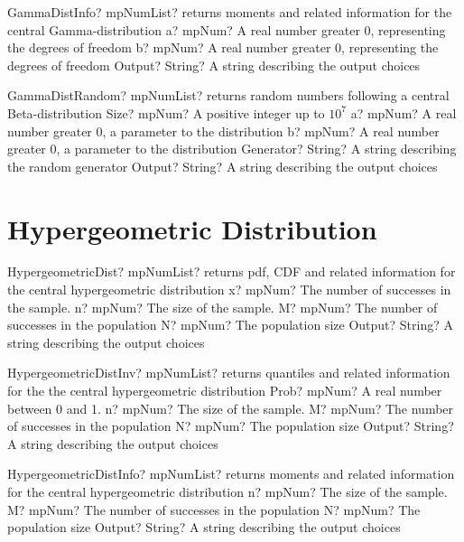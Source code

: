 \documentclass[12pt,a4paper,openany]{book}
\begin{document}
\begin{mpFunctionsExtract}
\mpFunctionTwo
{GammaDistInfo? mpNumList? returns moments and related information for the central Gamma-distribution}
{a? mpNum? A real number greater 0, representing the degrees of freedom}
{b? mpNum? A real number greater 0, representing the degrees of freedom}
{Output? String? A string describing the output choices}
\end{mpFunctionsExtract}

\begin{mpFunctionsExtract}
\mpFunctionFive
{GammaDistRandom? mpNumList? returns random numbers following a central Beta-distribution}
{Size? mpNum? A positive integer up to $10^7$}
{a? mpNum? A real number greater 0, a parameter to the distribution}
{b? mpNum? A real number greater 0, a parameter to the distribution}
{Generator? String? A string describing the random generator}
{Output? String? A string describing the output choices}
\end{mpFunctionsExtract}

\section{Hypergeometric Distribution}

\begin{mpFunctionsExtract}
\mpFunctionFive
{HypergeometricDist? mpNumList? returns pdf, CDF and related information for the central hypergeometric distribution}
{x? mpNum? The number of successes in the sample.}
{n? mpNum? The size of the sample.}
{M? mpNum? The number of successes in the population}
{N? mpNum? The population size}
{Output? String? A string describing the output choices}
\end{mpFunctionsExtract}

\begin{mpFunctionsExtract}
\mpFunctionFive
{HypergeometricDistInv? mpNumList? returns quantiles and related information for the the central hypergeometric distribution}
{Prob? mpNum? A real number between 0 and 1.}
{n? mpNum? The size of the sample.}
{M? mpNum? The number of successes in the population}
{N? mpNum? The population size}
{Output? String? A string describing the output choices}
\end{mpFunctionsExtract}

\begin{mpFunctionsExtract}
\mpFunctionFour
{HypergeometricDistInfo? mpNumList? returns moments and related information for the central hypergeometric distribution}
{n? mpNum? The size of the sample.}
{M? mpNum? The number of successes in the population}
{N? mpNum? The population size}
{Output? String? A string describing the output choices}
\end{mpFunctionsExtract}
\end{document}
